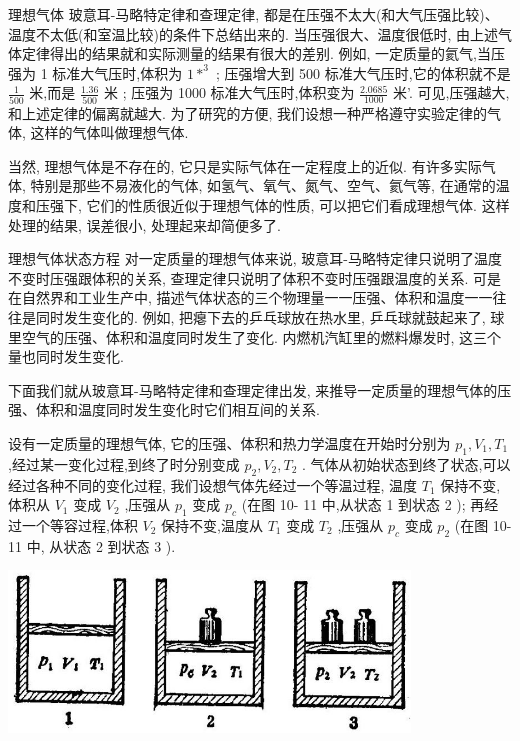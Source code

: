 \documentclass[10pt]{article}
\begin{document}
理想气体 玻意耳-马略特定律和查理定律, 都是在压强不太大(和大气压强比较)、温度不太低(和室温比较)的条件下总结出来的. 当压强很大、温度很低时, 由上述气体定律得出的结果就和实际测量的结果有很大的差别. 例如, 一定质量的氦气,当压强为 1 标准大气压时,体积为 \(1{ * }^{3}\) ; 压强增大到 500 标准大气压时,它的体积就不是 \(\frac{1}{500}\) 米,而是 \(\frac{1.36}{500}\) 米 ; 压强为 1000 标准大气压时,体积变为 \(\frac{2.0685}{1000}\) 米’. 可见,压强越大, 和上述定律的偏离就越大. 为了研究的方便, 我们设想一种严格遵守实验定律的气体, 这样的气体叫做理想气体.

当然, 理想气体是不存在的, 它只是实际气体在一定程度上的近似. 有许多实际气体, 特别是那些不易液化的气体, 如氢气、氧气、氮气、空气、氦气等, 在通常的温度和压强下, 它们的性质很近似于理想气体的性质, 可以把它们看成理想气体. 这样处理的结果, 误差很小, 处理起来却简便多了.

理想气体状态方程 对一定质量的理想气体来说, 玻意耳-马略特定律只说明了温度不变时压强跟体积的关系, 查理定律只说明了体积不变时压强跟温度的关系. 可是在自然界和工业生产中, 描述气体状态的三个物理量一一压强、体积和温度一一往往是同时发生变化的. 例如, 把瘪下去的乒乓球放在热水里, 乒乓球就鼓起来了, 球里空气的压强、体积和温度同时发生了变化. 内燃机汽缸里的燃料爆发时, 这三个量也同时发生变化.

下面我们就从玻意耳-马略特定律和查理定律出发, 来推导一定质量的理想气体的压强、体积和温度同时发生变化时它们相互间的关系.

设有一定质量的理想气体, 它的压强、体积和热力学温度在开始时分别为 \({p}_{1},{V}_{1},{T}_{1}\) ,经过某一变化过程,到终了时分别变成 \({p}_{2},{V}_{2},{T}_{2}\) . 气体从初始状态到终了状态,可以经过各种不同的变化过程, 我们设想气体先经过一个等温过程, 温度 \({T}_{1}\) 保持不变,体积从 \({V}_{1}\) 变成 \({V}_{2}\) ,压强从 \({p}_{1}\) 变成 \({p}_{c}\) (在图 10- 11 中,从状态 1 到状态 2 ); 再经过一个等容过程,体积 \({V}_{2}\) 保持不变,温度从 \({T}_{1}\) 变成 \({T}_{2}\) ,压强从 \({p}_{c}\) 变成 \({p}_{2}\) (在图 10-11 中, 从状态 2 到状态 3 ).

\begin{center}
\includegraphics[max width=0.8\textwidth]{images/01912d55-147c-70aa-b0e0-1782a122f948_295_617264.jpg}
\end{center}
\end{document}

